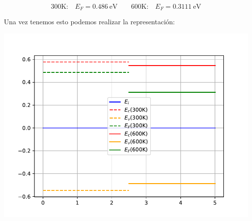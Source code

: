 \begin{texercise}
\begin{itemize}
		\begin{equation}
			\text{300K:}\quad
			E_F = 0.486 \ \text{eV} \qquad 
			\text{600K:}\quad
			E_F= 0.3111 \ \text{eV}
		\end{equation}
	\end{itemize}
	Una vez tenemos esto podemos realizar la representación:
	\begin{center}
		\includegraphics[width=0.9\linewidth]{Cuerpo/Ch_01/Ejercicio_01_6.pdf}
	\end{center}
\end{texercise}


